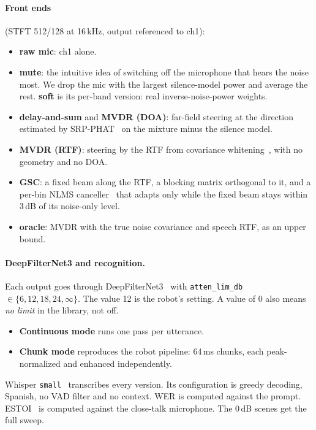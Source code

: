 \paragraph{Front ends} (STFT 512/128 at 16\,kHz, output referenced to ch1):
\begin{itemize}
\item \textbf{raw mic}: ch1 alone.
\item \textbf{mute}: the intuitive idea of switching off the microphone that
  hears the noise most. We drop the mic with the largest silence-model power
  and average the rest. \textbf{soft} is its per-band version: real
  inverse-noise-power weights.
\item \textbf{delay-and-sum} and \textbf{MVDR (DOA)}: far-field steering at
  the direction estimated by SRP-PHAT~\cite{dibiase2001srp} on the mixture
  minus the silence model.
\item \textbf{MVDR (RTF)}: steering by the RTF from covariance
  whitening~\cite{markovich2009rtf}, with no geometry and no DOA.
\item \textbf{GSC}: a fixed beam along the RTF, a blocking matrix orthogonal
  to it, and a per-bin NLMS canceller~\cite{griffiths1982gsc} that adapts
  only while the fixed beam stays within 3\,dB of its noise-only level.
\item \textbf{oracle}: MVDR with the true noise covariance and speech RTF,
  as an upper bound.
\end{itemize}

\paragraph{DeepFilterNet3 and recognition.} Each output goes through
DeepFilterNet3~\cite{schroeter2023deepfilternet3} with \texttt{atten\_lim\_db}
$\in\{6,12,18,24,\infty\}$. The value 12 is the robot's setting. A value of
0 also means \emph{no limit} in the library, not off.
\begin{itemize}
\item \textbf{Continuous mode} runs one pass per utterance.
\item \textbf{Chunk mode} reproduces the robot pipeline: 64\,ms chunks, each
  peak-normalized and enhanced independently.
\end{itemize}
Whisper \texttt{small}~\cite{radford2023whisper} transcribes every version.
Its configuration is greedy decoding, Spanish, no VAD filter and no context.
WER is computed against the prompt. ESTOI~\cite{jensen2016estoi} is computed
against the close-talk microphone. The 0\,dB scenes get the full sweep.
